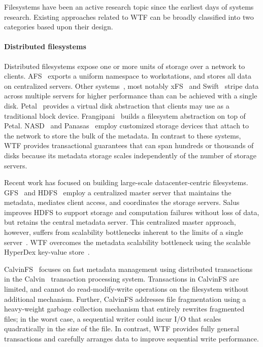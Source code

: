 \documentclass[twocolumn,10pt,letterpaper]{article}
\newcommand{\myparagraph}[1]{\vspace{-.25\baselineskip}\paragraph{#1}}
\begin{document}
Filesystems have been an active research topic since the earliest days of
systems research.  Existing approaches related to WTF can be broadly classified
into two categories based upon their design.

\myparagraph{Distributed filesystems}

Distributed filesystems expose one or more units of storage over a network to
clients.  AFS~\cite{afs} exports a uniform namespace to workstations, and stores
all data on centralized servers.   Other systems~\cite{zebra,gpfs,lustre}, most
notably xFS~\cite{xfs} and Swift~\cite{swift} stripe data across multiple
servers for higher performance than can be achieved with a single disk.
Petal~\cite{petal} provides a virtual disk abstraction that clients may use as a
traditional block device.  Frangipani~\cite{frangipani} builds a filesystem
abstraction on top of Petal.  NASD~\cite{nasd} and Panasas~\cite{panasas} employ
customized storage devices that attach to the network to store the bulk of the
metadata.  In contrast to these systems, WTF provides transactional guarantees
that can span hundreds or thousands of disks because its metadata storage scales
independently of the number of storage servers.

Recent work has focused on building large-scale datacenter-centric filesystems.
GFS~\cite{gfs} and HDFS~\cite{hdfs} employ a centralized master server that
maintains the metadata, mediates client access, and coordinates the storage
servers.  Salus~\cite{salus} improves HDFS to support storage and computation
failures without loss of data, but retains the central metadata server.  This
centralized master approach, however, suffers from scalability bottlenecks
inherent to the limits of a single server~\cite{gfsacmq}.  WTF overcomes the
metadata scalability bottleneck using the scalable HyperDex key-value
store~\cite{warp}.

CalvinFS~\cite{calvinfs} focuses on fast metadata management using distributed
transactions in the Calvin~\cite{calvin} transaction processing system.
Transactions in CalvinFS are limited, and cannot do read-modify-write operations
on the filesystem without additional mechanism.  Further, CalvinFS addresses
file fragmentation using a heavy-weight garbage collection mechanism that
entirely rewrites fragmented files; in the worst case, a sequential writer could
incur I/O that scales quadratically in the size of the file.  In contrast, WTF
provides fully general transactions and carefully arranges data to improve
sequential write performance.
\end{document}
